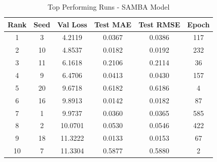 \begin{table}[ht]
\centering
\caption{Top Performing Runs - SAMBA Model}
\label{tab:samba_results}
\begin{tabular}{cccccc}
\hline
\textbf{Rank} & \textbf{Seed} & \textbf{Val Loss} & \textbf{Test MAE} & \textbf{Test RMSE} & \textbf{Epoch} \\
\hline
1 & 3 & 4.2119 & 0.0367 & 0.0386 & 117 \\
2 & 10 & 4.8537 & 0.0182 & 0.0192 & 232 \\
3 & 11 & 6.1618 & 0.2106 & 0.2114 & 36 \\
4 & 9 & 6.4706 & 0.0413 & 0.0430 & 157 \\
5 & 20 & 9.6718 & 0.6182 & 0.6186 & 4 \\
6 & 16 & 9.8913 & 0.0142 & 0.0182 & 87 \\
7 & 1 & 9.9737 & 0.0360 & 0.0365 & 585 \\
8 & 2 & 10.0701 & 0.0530 & 0.0546 & 422 \\
9 & 18 & 11.3222 & 0.0133 & 0.0153 & 67 \\
10 & 7 & 11.3304 & 0.5877 & 0.5880 & 2 \\
\hline
\end{tabular}
\end{table}
